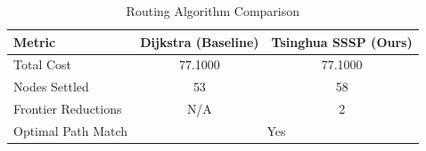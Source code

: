 \begin{table}[h]
\centering
\caption{Routing Algorithm Comparison}
\label{tab:routing}
\begin{tabular}{l c c}
\toprule
\textbf{Metric} & \textbf{Dijkstra (Baseline)} & \textbf{Tsinghua SSSP (Ours)} \\
\midrule
Total Cost & 77.1000 & 77.1000 \\
Nodes Settled & 53 & 58 \\
Frontier Reductions & N/A & 2 \\
Optimal Path Match & \multicolumn{2}{c}{Yes} \\
\bottomrule
\end{tabular}
\end{table}
